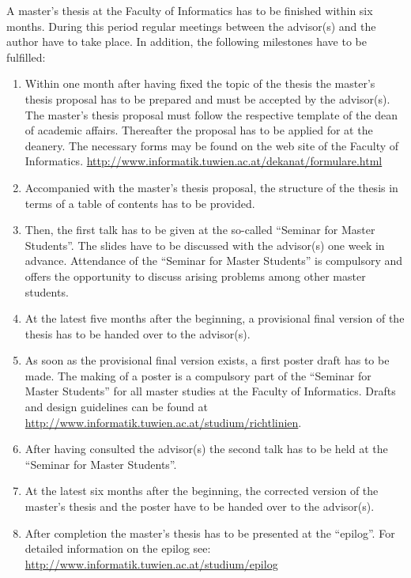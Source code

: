 A master's thesis at the Faculty of Informatics has to be finished within six
months.
During this period regular meetings between the advisor(s) and the author have
to take place.
In addition, the following milestones have to be fulfilled:
\begin{enumerate}
  \item  Within one month after having fixed the topic of the thesis the
	master's thesis proposal has to be prepared and must be accepted by the
	advisor(s).
	The master's thesis proposal must follow the respective template of the dean
	of academic affairs.
	Thereafter the proposal has to be applied for at the deanery.
	The necessary forms may be found on the web site of the Faculty of
	Informatics.
	\url{http://www.informatik.tuwien.ac.at/dekanat/formulare.html}
  \item  Accompanied with the master's thesis proposal, the structure of the
	thesis in terms of a table of contents has to be provided.
  \item Then, the first talk has to be given at the so-called ``Seminar for
	Master Students''.
	The slides have to be discussed with the advisor(s) one week in advance.
	Attendance of the ``Seminar for Master Students'' is compulsory and offers
	the opportunity to discuss arising problems among other master students.
  \item At the latest five months after the beginning, a provisional final
	version of the thesis has to be handed over to the advisor(s).  
  \item As soon as the provisional final version exists, a first poster draft
	has to be made.
	The making of a poster is a compulsory part of the ``Seminar for Master
	Students'' for all master studies at the Faculty of Informatics.
	Drafts and design guidelines can be found at
	\url{http://www.informatik.tuwien.ac.at/studium/richtlinien}.
  \item After having consulted the advisor(s) the second talk has to be held at
	the ``Seminar for Master Students''.
  \item At the latest six months after the beginning, the corrected version of
	the master's thesis and the poster have to be handed over to the advisor(s).
  \item After completion the master's thesis has to be presented at the
	``epilog''.
	For detailed information on the epilog see: \\
	\url{http://www.informatik.tuwien.ac.at/studium/epilog}
\end{enumerate}

